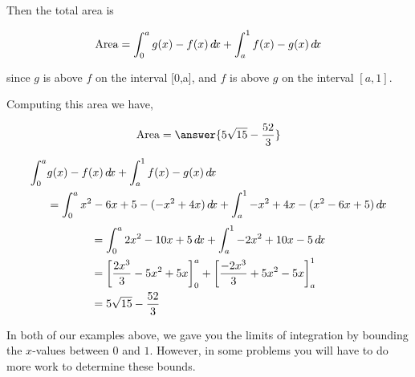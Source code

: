\documentclass{ximera}
\begin{document}
\begin{example}
\begin{explanation}
Then the total area is 

\[
\textrm{Area} = \int_0^a g(x) - f(x) \mathop{}\!d\! x + \int_a^1 f(x) - g(x) \mathop{}\!d\! x
\]

since $g$ is above $f$ on the interval [0,a], and $f$ is above $g$ on the interval $[a,1]$.

Computing this area we have,

\[
	\textrm{Area} = \answer{5\sqrt{15} - \frac{52}{3}}
\]

\begin{hint}

\begin{align*}
\int_0^a &g(x) - f(x) \d x + \int_a^1 f(x) - g(x) \d x \\ 
 &= \int_0^a x^2-6x+5-(-x^2+4x)\d x +\int_a^1 -x^2+4x-(x^2-6x+5)\d x
\end{align*}
\begin{align*}
  &=\int_0^a 2x^2-10x+5\mathop{}\!d\! x+\int_a^1 -2x^2+10x-5\mathop{}\!d\! x \\
  &= \bigg[ \frac{2x^3}{3}-5x^2+5x \bigg]_0^a + \bigg[  \frac{-2x^3}{3}+5x^2-5x \bigg]_a^1 \\
  &=5\sqrt{15}-\frac{52}{3}
\end{align*}
	
\end{hint}


\end{explanation}

\end{example}

In both of our examples above, we gave you the limits of integration
by bounding the $x$-values between $0$ and $1$. However, in some problems
you will have to do more work to determine these bounds.
\end{document}
